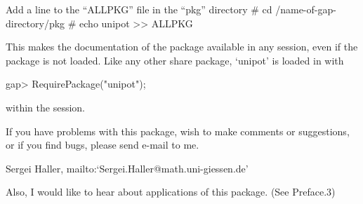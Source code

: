 Add a line to the ``ALLPKG'' file in the ``pkg'' directory
\begintt
# cd /name-of-gap-directory/pkg
# echo unipot >> ALLPKG
\endtt

This makes the documentation of the package available in any {}
session, even if the package is not loaded.
Like any other share package, `unipot' is loaded in {\GAP} with

\beginexample
gap> RequirePackage("unipot");
\endexample

within the {} session.

If you have problems with this package, wish to make comments
or suggestions, or if you find bugs, please send e-mail to me.

Sergei Haller, mailto:`Sergei.Haller@math.uni-giessen.de'

Also, I would like to hear about applications of this package.
(See Preface.3)




